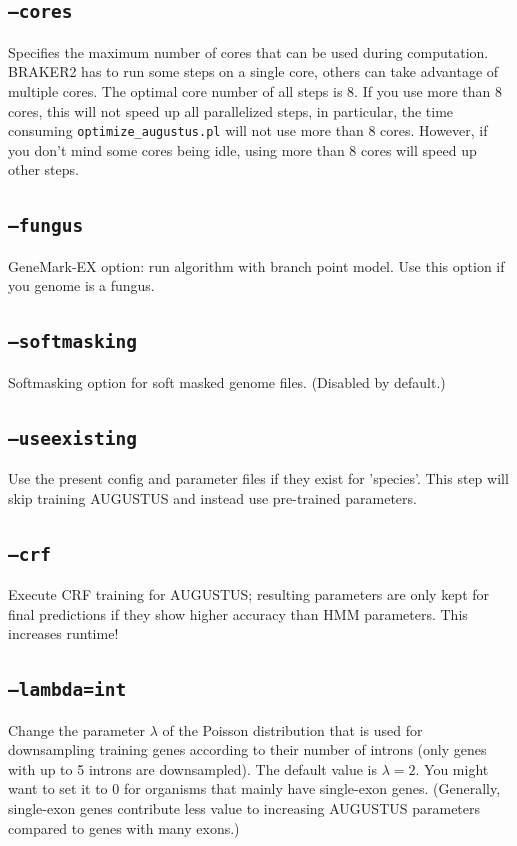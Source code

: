 \documentclass[a4paper,10pt]{report}
\begin{document}
\subsection{\texttt{--cores}}                              Specifies the maximum number of cores that can be used during computation. BRAKER2 has to run some steps on a single core, others can take advantage of multiple cores. The optimal core number of all steps is 8. If you use more than 8 cores, this will not speed up all parallelized steps, in particular, the time consuming \texttt{optimize\_augustus.pl} will not use more than 8 cores. However, if you don't mind some cores being idle, using more than 8 cores will speed up other steps.
\subsection{\texttt{--fungus}}                             GeneMark-EX option: run algorithm with branch point model. Use this option if you genome is a fungus.
    \subsection{\texttt{--softmasking}}                        Softmasking option for soft masked genome files. (Disabled by default.)
   
    \subsection{\texttt{--useexisting}}                        Use the present config and parameter files if they exist for 
                                         'species'. This step will skip training AUGUSTUS and instead use pre-trained parameters.
  
    \subsection{\texttt{--crf}}                                Execute CRF training for AUGUSTUS; resulting parameters are only kept for
                                         final predictions if they show higher accuracy than HMM parameters. This increases runtime!
    \subsection{\texttt{--lambda=int}}
    Change the parameter $\lambda$ of the Poisson distribution that is used for downsampling training genes according to their number of introns (only genes with up to 5 introns are downsampled). The default value is $\lambda=2$. You might want to set it to 0 for organisms that mainly have single-exon genes. (Generally, single-exon genes contribute less value to increasing AUGUSTUS parameters compared to genes with many exons.)
              
\end{document}
